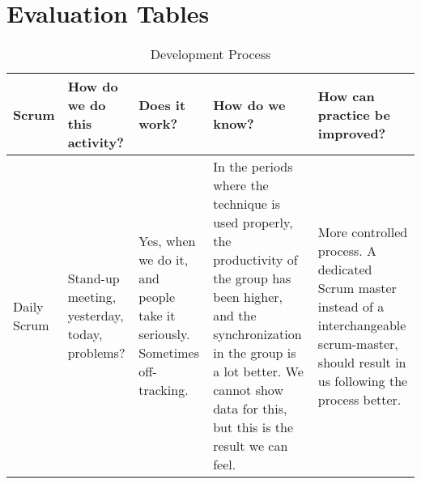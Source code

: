 \chapter{Evaluation Tables}

\begin{sidewaystable}
\centering
\caption{Development Process}
\label{tab:dev-process-eval}
\begin{tabularx}{\textwidth}{|l|X|X|X|X|}
\hline
Scrum
& How do we do this activity?                                                                                                                                                                             & Does it work?                                                                                                                                                                                                                                                                              & How do we know?                                                                                                                                                                                                                                                                                                                                                                                                                                         & How can practice be improved?                                                                                                                                                                                                                                                                \\ \hline
Daily Scrum                 
& Stand-up meeting, yesterday, today, problems?                                                                                                                                                           
& Yes, when we do it, and people take it seriously. Sometimes off-tracking.                                                                                                                                                                                                                   
& In the periods where the technique is used properly, the productivity of the group has been higher, and the synchronization in the group is a lot better. We cannot show data for this, but this is the result we can feel.                                                                                                                                                                                                                             & More controlled process. A dedicated Scrum master instead of a interchangeable scrum-master, should result in us following the process better.                                                                                                                                                \\ \hline

\end{tabularx}
\end{sidewaystable}
